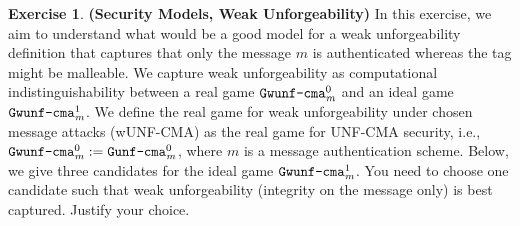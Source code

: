 \documentclass[envcountsame,runningheads,notitlepage]{../llncs}
\theoremstyle{definition}
\newtheorem{graded}[crossed]{Exercise}
\newcommand{\V}[1]{\ensuremath{\mathit{#1}}}
\newcommand{\M}[1]{\ensuremath{\text{\tt#1}}}
\newcommand{\StyleModel}[1]{\V{{#1}}}
\newcommand{\m}{\StyleModel{m}}
\begin{document}
\clearpage
\begin{graded}\textbf{(Security Models, Weak Unforgeability)}
In this exercise, we aim to understand what would be a good model for a weak unforgeability definition that captures that only the message $m$ is authenticated whereas the tag might be malleable. We capture weak unforgeability as computational indistinguishability between a real game $\M{Gwunf-cma}^0_\m$ and an ideal game $\M{Gwunf-cma}^1_\m$. We define the real game for weak unforgeability under chosen message attacks (wUNF-CMA) as the real game for UNF-CMA security, i.e., $\M{Gwunf-cma}^0_\m:=\M{Gunf-cma}^0_\m$, where $\m$ is a message authentication scheme. Below, we give three candidates for the ideal game $\M{Gwunf-cma}^1_\m$. You need to choose one candidate such that weak unforgeability (integrity on the message only) is best captured. Justify your choice.

\end{graded}
\end{document}

